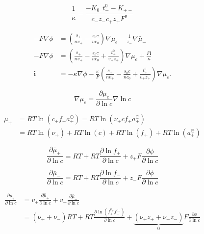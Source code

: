 \documentclass[lettersize,journal]{IEEEtran}
\begin{document}
\begin{equation}
\frac{1}{\kappa}=\frac{-K_{0_{-}} t_{-}^{0}-K_{+-}}{c_{-} z_{-} c_{+} z_{+} F^{2}}
\end{equation}

\begin{equation}
\begin{aligned}
-F \nabla \phi &=\left(\frac{s_{+}}{n v_{+}}-\frac{s_{0} c}{n c_{0}}\right) \nabla \mu_{e}-\frac{1}{z_{-}} \nabla \bar{\mu}_{-} \\
-F \nabla \phi &=\left(\frac{s_{+}}{n v_{+}}-\frac{s_{0} c}{n c_{0}}+\frac{t_{+}^{0}}{v_{+} z_{+}}\right) \nabla \mu_{e}+\frac{F \mathbf{i}}{\kappa} \\
\mathbf{i} &=-\kappa \nabla \phi-\frac{\kappa}{F}\left(\frac{s_{+}}{n v_{+}}-\frac{s_{0} c}{n c_{0}}+\frac{t_{+}^{0}}{v_{+} z_{+}}\right) \nabla \mu_{e} .
\end{aligned}
\end{equation}

\begin{equation}
\nabla \mu_{e}=\frac{\partial \mu_{e}}{\partial \ln c} \nabla \ln c
\end{equation}

\begin{equation}
\begin{aligned}
\mu_{+} &=R T \ln \left(c_{+} f_{+} a_{+}^{\ominus}\right)=R T \ln \left(\nu_{+} c f_{+} a_{+}^{\ominus}\right) \\
&=R T \ln \left(\nu_{+}\right)+R T \ln (c)+R T \ln \left(f_{+}\right)+R T \ln \left(a_{+}^{\ominus}\right)
\end{aligned}
\end{equation}

\begin{equation}
\frac{\partial \bar{\mu}_{+}}{\partial \ln c}=R T+R T \frac{\partial \ln f_{+}}{\partial \ln c}+z_{+} F \frac{\partial \phi}{\partial \ln c}
\end{equation}

\begin{equation}
\frac{\partial \bar{\mu}_{-}}{\partial \ln c}=R T+R T \frac{\partial \ln f_{-}}{\partial \ln c}+z_{-} F \frac{\partial \phi}{\partial \ln c}
\end{equation}

\begin{equation}
\begin{aligned}
\frac{\partial \mu_{e}}{\partial \ln c} &=v_{+} \frac{\partial \bar{\mu}_{+}}{\partial \ln c}+v_{-} \frac{\partial \bar{\mu}_{-}}{\partial \ln c} \\
&=\left(\nu_{+}+\nu_{-}\right) R T+R T \frac{\partial \ln \left(f_{+}^{v_{+}} f_{-}^{v_{-}}\right)}{\partial \ln c}+\underbrace{\left(\nu_{+} z_{+}+\nu_{-} z_{-}\right)}_{0} F \frac{\partial \phi}{\partial \ln c}
\end{aligned}
\end{equation}
\end{document}
